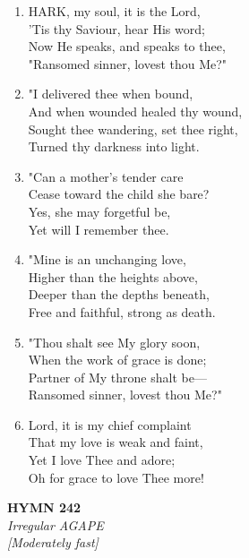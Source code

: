 \begin{enumerate}
    \item HARK, my soul, it is the Lord, \\
        'Tis thy Saviour, hear His word; \\
        Now He speaks, and speaks to thee, \\
        "Ransomed sinner, lovest thou Me?"

    \item "I delivered thee when bound, \\
        And when wounded healed thy wound, \\
        Sought thee wandering, set thee right, \\
        Turned thy darkness into light.

    \item "Can a mother's tender care \\
        Cease toward the child she bare? \\
        Yes, she may forgetful be, \\
        Yet will I remember thee.

    \item "Mine is an unchanging love, \\
        Higher than the heights above, \\
        Deeper than the depths beneath, \\
        Free and faithful, strong as death.

    \item "Thou shalt see My glory soon, \\
        When the work of grace is done; \\
        Partner of My throne shalt be--- \\
        Ransomed sinner, lovest thou Me?"

    \item Lord, it is my chief complaint \\
        That my love is weak and faint, \\
        Yet I love Thee and adore; \\
        Oh for grace to love Thee more!

\end{enumerate}

\newpage
\begin{center}
    {\Large \textbf{HYMN 242}}
    \\
    \textit{Irregular AGAPE}
    \\
    \textit{\small [Moderately fast]}
\end{center}
\vspace{1em}

